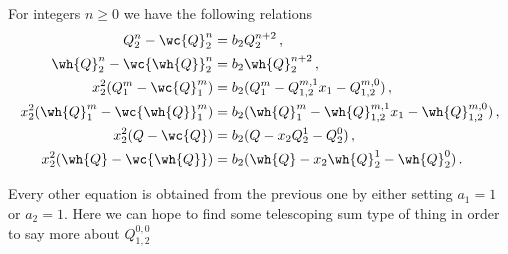 \begin{corollary} For integers $n \ge 0$ we have the following relations
\begin{align}
	Q_2^n-\wc{Q}_2^n &= b_2 Q_2^{n+2}\,,\\
	\wh{Q}_2^n-\wc{\wh{Q}}_2^n &= b_2 \wh{Q}_2^{n+2}\,,\\
	x_2^2(Q_1^m-\wc{Q}_1^m) &=  b_2 (Q_1^m - Q_{1,2}^{m,1}x_1 - Q_{1,2}^{m,0})\,,\\
	x_2^2(\wh{Q}_1^m-\wc{\wh{Q}}_1^m) &=  b_2 (\wh{Q}_1^m - \wh{Q}_{1,2}^{m,1}x_1 - \wh{Q}_{1,2}^{m,0})\,,\\
	x_2^2(Q-\wc{Q}) &= b_2(Q-x_2Q_2^1-Q_2^0)\,,\\
	x_2^2(\wh{Q}-\wc{\wh{Q}}) &= b_2(\wh{Q}-x_2\wh{Q}_2^1-\wh{Q}_2^0)\,.
\end{align}
\end{corollary}
Every other equation is obtained from the previous one by either setting $a_1 = 1$ or $a_2 = 1$. Here we can hope to find some telescoping sum type of thing in order to say more about $Q_{1,2}^{0,0}$

